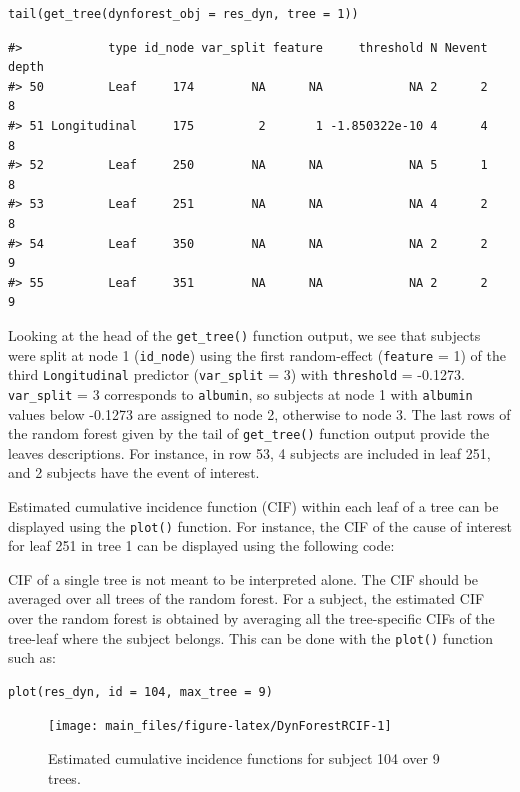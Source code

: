 \begin{verbatim}
tail(get_tree(dynforest_obj = res_dyn, tree = 1))
\end{verbatim}

\begin{verbatim}
#>            type id_node var_split feature     threshold N Nevent depth
#> 50         Leaf     174        NA      NA            NA 2      2     8
#> 51 Longitudinal     175         2       1 -1.850322e-10 4      4     8
#> 52         Leaf     250        NA      NA            NA 5      1     8
#> 53         Leaf     251        NA      NA            NA 4      2     8
#> 54         Leaf     350        NA      NA            NA 2      2     9
#> 55         Leaf     351        NA      NA            NA 2      2     9
\end{verbatim}

\noindent Looking at the head of the \texttt{get\_tree()} function output, we see that subjects were split at node 1 (\texttt{id\_node}) using the first random-effect (\texttt{feature} = 1) of the third \texttt{Longitudinal} predictor (\texttt{var\_split} = 3) with \texttt{threshold} = -0.1273. \texttt{var\_split} = 3 corresponds to \texttt{albumin}, so subjects at node 1 with \texttt{albumin} values below -0.1273 are assigned to node 2, otherwise to node 3. The last rows of the random forest given by the tail of \texttt{get\_tree()} function output provide the leaves descriptions. For instance, in row 53, 4 subjects are included in leaf 251, and 2 subjects have the event of interest.

Estimated cumulative incidence function (CIF) within each leaf of a tree can be displayed using the \texttt{plot()} function. For instance, the CIF of the cause of interest for leaf 251 in tree 1 can be displayed using the following code:

CIF of a single tree is not meant to be interpreted alone. The CIF should be averaged over all trees of the random forest. For a subject, the estimated CIF over the random forest is obtained by averaging all the tree-specific CIFs of the tree-leaf where the subject belongs. This can be done with the \texttt{plot()} function such as:

\begin{verbatim}
plot(res_dyn, id = 104, max_tree = 9)
\end{verbatim}

\begin{figure}

{\centering \texttt{[image: main\_files/figure-latex/DynForestRCIF-1]} 

}

\caption{Estimated cumulative incidence functions for subject 104 over 9 trees.}\label{fig:DynForestRCIF}
\end{figure}

